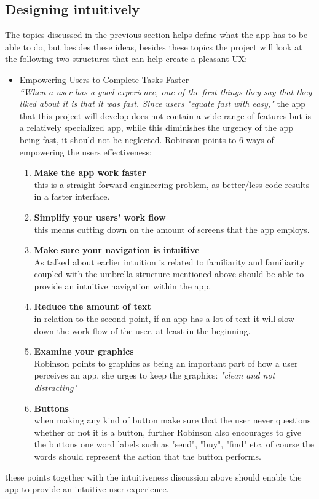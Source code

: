 \subsection{ Designing intuitively  }
The topics discussed in the previous section helps define what the app has to be 
able to do, but besides these ideas, besides these topics the project will look 
at the following two structures that can help create a pleasant UX:
\begin{itemize}
\item  Empowering Users to Complete Tasks Faster\\
 \textit{“When a user has a good experience, one of the first things they say 
 that they liked about it is that it was fast. Since users "equate fast with 
 easy," }\cite{UXKeys} the app that this project will develop does not contain a 
 wide range of features but is a relatively specialized app, while this 
 diminishes the urgency of the app being fast, it should not be neglected. 
 Robinson points to 6 ways of empowering the users effectiveness\cite{UXKeys}:
 \begin{enumerate}
 \item \textbf{Make the app work faster}\\
 this is a straight forward engineering problem, as better/less code results in a 
 faster interface. 
 \item \textbf{Simplify your users’ work flow}\\
  this means cutting down on the amount of screens that the app employs.
 \item \textbf{Make sure your navigation is intuitive}\\\label{effectivenessP3}
 As talked about earlier intuition is related to familiarity and familiarity 
 coupled with the umbrella structure mentioned above should be able to provide an 
 intuitive navigation within the app.
 \item \textbf{Reduce the amount of text}\\
 in relation to the second point, if an app has a lot of text it will slow down 
 the work flow of the user, at least in the beginning.
 \item \textbf{Examine your graphics}\\
 Robinson points to graphics as being an important part of how a user perceives 
 an app, she urges to keep the graphics: \textit{"clean and not distracting"} 
 \item \textbf{Buttons}\\
 when making any kind of button make sure that the user never questions whether 
 or not it is a button, further Robinson also encourages to give the buttons one 
 word labels such as "send", "buy", "find" etc. of course the words should 
 represent the action that the button performs.
 \end{enumerate} 
\end{itemize} 
these points together with the intuitiveness discussion above should enable the 
app to provide an intuitive user experience. 

